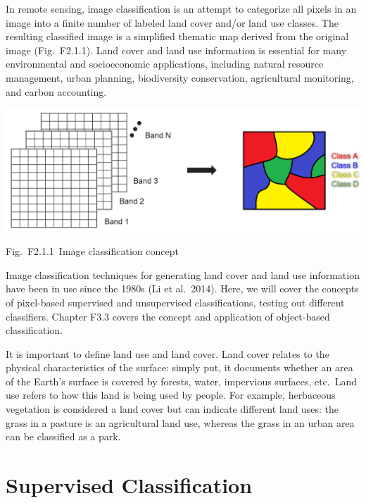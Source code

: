 \documentclass[
  letterpaper,
  DIV=11,
  numbers=noendperiod]{scrreprt}
\begin{document}
In remote sensing, image classification is an attempt to categorize all
pixels in an image into a finite number of labeled land cover and/or
land use classes. The resulting classified image is a simplified
thematic map derived from the original image (Fig.~F2.1.1). Land cover
and land use information is essential for many environmental and
socioeconomic applications, including natural resource management, urban
planning, biodiversity conservation, agricultural monitoring, and carbon
accounting.

\includegraphics{./F2/image48.png}

Fig.~F2.1.1~Image classification concept

Image classification techniques for generating land cover and land use
information have been in use since the 1980s (Li et al.~2014). Here, we
will cover the concepts of pixel-based supervised and unsupervised
classifications, testing out different classifiers. Chapter F3.3 covers
the concept and application of object-based classification.

It is important to define land use and land cover. Land cover relates to
the physical characteristics of the surface: simply put, it documents
whether an area of the Earth's surface is covered by forests, water,
impervious surfaces, etc.~Land use refers to how this land is being used
by people. For example, herbaceous vegetation is considered a land cover
but can indicate different land uses: the grass in a pasture is an
agricultural land use, whereas the grass in an urban area can be
classified as a park.

\hypertarget{supervised-classification}{%
\section{Supervised Classification}\label{supervised-classification}}
\end{document}
